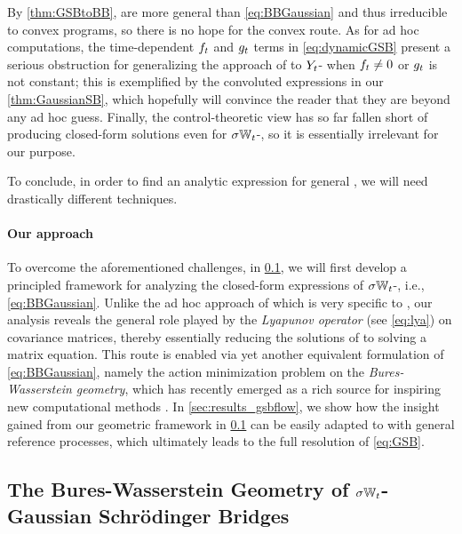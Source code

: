 By \cref{thm:GSBtoBB},  are more general than \eqref{eq:BBGaussian} and thus irreducible to convex programs, so there is no hope for the convex route. As for ad hoc computations, the time-dependent $\driftf$ and $\volat[\ctime]$ terms in \eqref{eq:dynamicGSB} present a serious obstruction for generalizing the approach of \citet{mallasto2021entropy} to $\refsde$- when $\driftf \neq 0$ or $\volat[\ctime]$ is not constant; this is exemplified by the convoluted expressions in our \cref{thm:GaussianSB}, which hopefully will convince the reader that they are beyond any ad hoc guess. Finally, the control-theoretic view has so far fallen short of producing closed-form solutions even for $\sigma\Wiener$-, so it is essentially irrelevant for our purpose. 

To conclude, in order to find an analytic expression for general , we will need drastically different techniques.





\paragraph{Our approach}

To overcome the aforementioned challenges, in \cref{sec:mechanics_gsbflow}, we will first develop a principled framework for analyzing the closed-form expressions of $\sigma\Wiener$-, i.e., \eqref{eq:BBGaussian}. Unlike the ad hoc approach of \citet{mallasto2021entropy} which is very specific to , our analysis reveals the general role played by the \emph{Lyapunov operator} (see \eqref{eq:lya}) on covariance matrices, thereby essentially reducing the solutions of  to solving a matrix equation. This route is enabled via yet another equivalent formulation of \eqref{eq:BBGaussian}, namely the action minimization problem on the \emph{Bures-Wasserstein geometry}, which has recently emerged as a rich source for inspiring new computational methods \citep{chewi2020gradient, altschuler2021averaging, han2021riemannian}. In \cref{sec:results_gsbflow}, we show how the insight gained from our geometric framework in \cref{sec:mechanics_gsbflow} can be easily adapted to  with general reference processes, which ultimately leads to the full resolution of \eqref{eq:GSB}.


\subsection{The Bures-Wasserstein Geometry of $\sigma\Wiener$-Gaussian Schr\"odinger Bridges}
\label{sec:mechanics_gsbflow}


